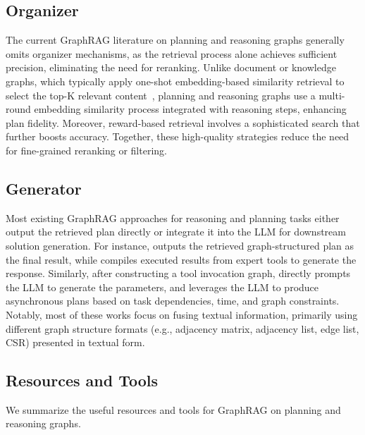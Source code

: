 \subsection{Organizer}
The current GraphRAG literature on planning and reasoning graphs generally omits organizer mechanisms, as the retrieval process alone achieves sufficient precision, eliminating the need for reranking. Unlike document or knowledge graphs, which typically apply one-shot embedding-based similarity retrieval to select the top-K relevant content~\cite{wu2024stark}, planning and reasoning graphs use a multi-round embedding similarity process integrated with reasoning steps, enhancing plan fidelity. Moreover, reward-based retrieval involves a sophisticated search that further boosts accuracy. Together, these high-quality strategies reduce the need for fine-grained reranking or filtering.


\subsection{Generator}
Most existing GraphRAG approaches for reasoning and planning tasks either output the retrieved plan directly or integrate it into the LLM for downstream solution generation. For instance, \citet{wu2024can} outputs the retrieved graph-structured plan as the final result, while \citet{shen2024hugginggpt} compiles executed results from expert tools to generate the response. Similarly, after constructing a tool invocation graph, \citet{shen2023taskbench} directly prompts the LLM to generate the parameters, and \citet{lin2024graph} leverages the LLM to produce asynchronous plans based on task dependencies, time, and graph constraints. Notably, most of these works focus on fusing textual information, primarily using different graph structure formats (e.g., adjacency matrix, adjacency list, edge list, CSR) presented in textual form.




\subsection{ Resources and Tools}

We summarize the useful resources and tools for GraphRAG on planning and reasoning graphs. 


